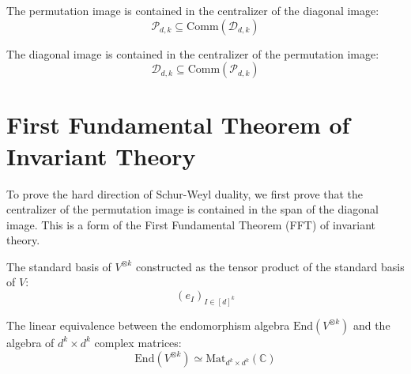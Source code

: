 \begin{theorem}\label{thm:permImage_subset_centralizer_diagImage}
  \leanok
  The permutation image is contained in the centralizer of the diagonal image:
  \begin{equation}
    \mathcal{P}_{d,k} \subseteq \text{Comm}(\mathcal{D}_{d,k})
  \end{equation}
\end{theorem}

\begin{theorem}\label{thm:diagImage_subset_centralizer_permImage}
  \leanok
  The diagonal image is contained in the centralizer of the permutation image:
  \begin{equation}
    \mathcal{D}_{d,k} \subseteq \text{Comm}(\mathcal{P}_{d,k})
  \end{equation}
\end{theorem}


\section{First Fundamental Theorem of Invariant Theory}

To prove the hard direction of Schur-Weyl duality, we first prove that the centralizer of the permutation image is contained in the span of the diagonal image. This is a form of the First Fundamental Theorem (FFT) of invariant theory.

{\chat
\begin{definition}\label{def:tensorBasis}
  \leanok
  The standard basis of $V^{\otimes k}$ constructed as the tensor product of the standard basis of $V$:
  \begin{equation}
    (e_I)_{I \in [d]^k}
  \end{equation}
\end{definition}
} %

\begin{definition}\label{def:toEndMatrix}
  \leanok
  The linear equivalence between the endomorphism algebra $\text{End}(V^{\otimes k})$ and the algebra of $d^k \times d^k$ complex matrices:
  \begin{equation}
    \text{End}(V^{\otimes k}) \simeq \text{Mat}_{d^k \times d^k}(\mathbb{C})
  \end{equation}
\end{definition}

